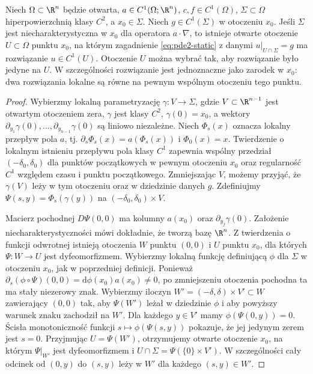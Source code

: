 \begin{twierdzenie}
\label{thm:pde2-cauchy}
Niech $\Omega\subset\R^n$ będzie otwarta,
$a\in C^1(\Omega;\R^n)$, $c,f\in C^1(\Omega)$,
$\Sigma\subset\Omega$
hiperpowierzchnią klasy $C^2$, a $x_0\in\Sigma$.
Niech $g\in C^1(\Sigma)$ w otoczeniu $x_0$.
Jeśli $\Sigma$ jest niecharakterystyczna w $x_0$ dla
operatora $a\cdot\nabla$, to istnieje otwarte otoczenie
$U\subset\Omega$ punktu $x_0$, na którym zagadnienie
\eqref{eq:pde2-static} z danymi $u|_{U\cap\Sigma}=g$
ma rozwiązanie $u\in C^1(U)$. Otoczenie $U$ można wybrać
tak, aby rozwiązanie było jedyne na $U$.
W szczególności rozwiązanie jest jednoznaczne jako zarodek
w $x_0$: dwa rozwiązania lokalne są równe na pewnym
wspólnym otoczeniu tego punktu.
\end{twierdzenie}
\begin{proof}
Wybierzmy lokalną parametryzację
$\gamma\colon V\to\Sigma$, gdzie $V\subset\R^{n-1}$
jest otwartym otoczeniem zera, $\gamma$ jest klasy $C^2$,
$\gamma(0)=x_0$, a wektory
$\partial_{y_1}\gamma(0),\ldots,\partial_{y_{n-1}}\gamma(0)$
są liniowo niezależne. Niech $\Phi_s(x)$ oznacza lokalny
przepływ pola $a$, tj. $\partial_s\Phi_s(x)=a(\Phi_s(x))$
i $\Phi_0(x)=x$. Twierdzenie o lokalnym istnieniu
przepływu pola klasy $C^1$ zapewnia wspólny przedział
$(-\delta_0,\delta_0)$ dla punktów początkowych w pewnym
otoczeniu $x_0$ oraz regularność $C^1$ względem czasu
i punktu początkowego. Zmniejszając $V$, możemy przyjąć,
że $\gamma(V)$ leży w tym otoczeniu oraz w dziedzinie danych $g$.
Zdefiniujmy $\Psi(s,y)=\Phi_s(\gamma(y))$ na
$(-\delta_0,\delta_0)\times V$.

Macierz pochodnej $D\Psi(0,0)$ ma kolumny
$a(x_0)$ oraz $\partial_{y_j}\gamma(0)$. Założenie
niecharakterystyczności mówi dokładnie, że tworzą bazę
$\R^n$. Z twierdzenia o funkcji odwrotnej istnieją
otoczenia $W$ punktu $(0,0)$ i $U$ punktu $x_0$,
dla których $\Psi\colon W\to U$ jest dyfeomorfizmem.
Wybierzmy lokalną funkcję definiującą $\phi$ dla $\Sigma$
w otoczeniu $x_0$, jak w poprzedniej definicji.
Ponieważ
$\partial_s(\phi\circ\Psi)(0,0)=\mathrm d\phi(x_0)a(x_0)\ne0$,
po zmniejszeniu otoczenia pochodna ta ma stały niezerowy znak.
Wybierzmy iloczyn $W'=(-\delta,\delta)\times V'\subset W$
zawierający $(0,0)$ tak, aby $\Psi(W')$ leżał w dziedzinie
$\phi$ i aby powyższy warunek znaku zachodził na $W'$.
Dla każdego $y\in V'$ mamy $\phi(\Psi(0,y))=0$.
Ścisła monotoniczność funkcji $s\mapsto\phi(\Psi(s,y))$
pokazuje, że jej jedynym zerem jest $s=0$.
Przyjmując $U=\Psi(W')$, otrzymujemy otwarte otoczenie $x_0$,
na którym $\Psi|_{W'}$ jest dyfeomorfizmem i
$U\cap\Sigma=\Psi(\{0\}\times V')$.
W szczególności cały odcinek od $(0,y)$ do $(s,y)$
leży w $W'$ dla każdego $(s,y)\in W'$.


\end{proof}
